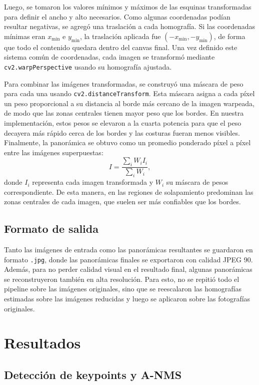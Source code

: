 \documentclass[a4paper,11pt]{article}
\begin{document}
Luego, se tomaron los valores mínimos y máximos de las esquinas transformadas para definir el ancho y alto necesarios. Como algunas coordenadas podían resultar negativas, se agregó una traslación a cada homografía. Si las coordenadas mínimas eran \(x_{\min}\) e \(y_{\min}\), la traslación aplicada fue \((-x_{\min}, -y_{\min})\), de forma que todo el contenido quedara dentro del canvas final. Una vez definido este sistema común de coordenadas, cada imagen se transformó mediante \texttt{cv2.warpPerspective} usando su homografía ajustada.

Para combinar las imágenes transformadas, se construyó una máscara de peso para cada una usando \texttt{cv2.distanceTransform}. Esta máscara asigna a cada píxel un peso proporcional a su distancia al borde más cercano de la imagen warpeada, de modo que las zonas centrales tienen mayor peso que los bordes. En nuestra implementación, estos pesos se elevaron a la cuarta potencia para que el peso decayera más rápido cerca de los bordes y las costuras fueran menos visibles. Finalmente, la panorámica se obtuvo como un promedio ponderado píxel a píxel entre las imágenes superpuestas:
\[
I = \frac{\sum_i W_i I_i}{\sum_i W_i},
\]
donde \(I_i\) representa cada imagen transformada y \(W_i\) su máscara de pesos correspondiente. De esta manera, en las regiones de solapamiento predominan las zonas centrales de cada imagen, que suelen ser más confiables que los bordes.

\subsection*{Formato de salida}

Tanto las imágenes de entrada como las panorámicas resultantes se guardaron en formato \texttt{.jpg}, donde las panorámicas finales se exportaron con calidad JPEG 90. Además, para no perder calidad visual en el resultado final, algunas panorámicas se reconstruyeron también en alta resolución. Para esto, no se repitió todo el pipeline sobre las imágenes originales, sino que se reescalaron las homografías estimadas sobre las imágenes reducidas y luego se aplicaron sobre las fotografías originales.

\section{Resultados}

\subsection*{Detección de keypoints y A-NMS}
\end{document}

